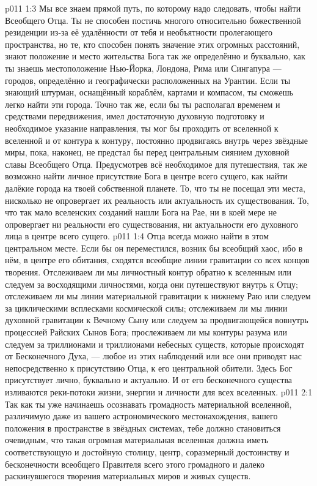 \vs p011 1:3 \pc Мы все знаем прямой путь, по которому надо следовать, чтобы найти Всеобщего Отца. Ты не способен постичь многого относительно божественной резиденции из\hyp{}за её удалённости от тебя и необъятности пролегающего пространства, но те, кто способен понять значение этих огромных расстояний, знают положение и место жительства Бога так же определённо и буквально, как ты знаешь местоположение Нью\hyp{}Йорка, Лондона, Рима или Сингапура --- городов, определённо и географически расположенных на Урантии. Если ты знающий штурман, оснащённый кораблём, картами и компасом, ты сможешь легко найти эти города. Точно так же, если бы ты располагал временем и средствами передвижения, имел достаточную духовную подготовку и необходимое указание направления, ты мог бы проходить от вселенной к вселенной и от контура к контуру, постоянно продвигаясь внутрь через звёздные миры, пока, наконец, не предстал бы перед центральным сиянием духовной славы Всеобщего Отца. Предусмотрев всё необходимое для путешествия, так же возможно найти личное присутствие Бога в центре всего сущего, как найти далёкие города на твоей собственной планете. То, что ты не посещал эти места, нисколько не опровергает их реальность или актуальность их существования. То, что так мало вселенских созданий нашли Бога на Рае, ни в коей мере не опровергает ни реальности его существования, ни актуальности его духовного лица в центре всего сущего.
\vs p011 1:4 Отца всегда можно найти в этом центральном месте. Если бы он переместился, возник бы всеобщий хаос, ибо в нём, в центре его обитания, сходятся всеобщие линии гравитации со всех концов творения. Отслеживаем ли мы личностный контур обратно к вселенным или следуем за восходящими личностями, когда они путешествуют внутрь к Отцу; отслеживаем ли мы линии материальной гравитации к нижнему Раю или следуем за циклическими всплесками космической силы; отслеживаем ли мы линии духовной гравитации к Вечному Сыну или следуем за продвигающейся вовнутрь процессией Райских Сынов Бога; прослеживаем ли мы контуры разума или следуем за триллионами и триллионами небесных существ, которые происходят от Бесконечного Духа, --- любое из этих наблюдений или все они приводят нас непосредственно к присутствию Отца, к его центральной обители. Здесь Бог присутствует лично, буквально и актуально. И от его бесконечного существа изливаются реки\hyp{}потоки жизни, энергии и личности для всех вселенных.
\vs p011 2:1 Так как ты уже начинаешь осознавать громадность материальной вселенной, различимую даже из вашего астрономического местонахождения, вашего положения в пространстве в звёздных системах, тебе должно становиться очевидным, что такая огромная материальная вселенная должна иметь соответствующую и достойную столицу, центр, соразмерный достоинству и бесконечности всеобщего Правителя всего этого громадного и далеко раскинувшегося творения материальных миров и живых существ.
